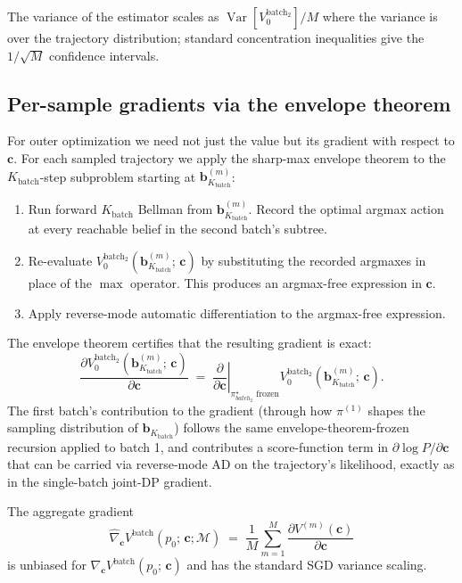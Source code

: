 \documentclass[11pt,a4paper]{article}
\newcommand{\bc}{\bm{c}}
\newcommand{\bb}{\bm{b}}
\newcommand{\Var}{\operatorname{Var}}
\begin{document}
The variance of the estimator scales as $\Var[V_0^{\mathrm{batch}_2}] / M$ where the
variance is over the trajectory distribution; standard concentration inequalities give
the $1/\sqrt{M}$ confidence intervals.

\subsection{Per-sample gradients via the envelope theorem}

For outer optimization we need not just the value but its gradient with respect to $\bc$.
For each sampled trajectory we apply the sharp-max envelope theorem to the
$K_\mathrm{batch}$-step subproblem starting at $\bb_{K_\mathrm{batch}}^{(m)}$:
\begin{enumerate}[nosep, leftmargin=2em]
\item Run forward $K_\mathrm{batch}$ Bellman from $\bb_{K_\mathrm{batch}}^{(m)}$.  Record
      the optimal argmax action at every reachable belief in the second batch's subtree.
\item Re-evaluate $V_0^{\mathrm{batch}_2}(\bb_{K_\mathrm{batch}}^{(m)};\, \bc)$ by
      substituting the recorded argmaxes in place of the $\max$ operator.  This produces
      an argmax-free expression in $\bc$.
\item Apply reverse-mode automatic differentiation to the argmax-free expression.
\end{enumerate}

The envelope theorem certifies that the resulting gradient is exact:
\begin{equation}
\frac{\partial V_0^{\mathrm{batch}_2}(\bb_{K_\mathrm{batch}}^{(m)};\, \bc)}{\partial \bc}
\;=\;
\left.\frac{\partial}{\partial \bc}\right|_{\pi^\star_{batch_2} \text{ frozen}}
V_0^{\mathrm{batch}_2}(\bb_{K_\mathrm{batch}}^{(m)};\, \bc).
\label{eq:envelope}
\end{equation}
The first batch's contribution to the gradient (through how $\pi^{(1)}$ shapes the sampling
distribution of $\bb_{K_\mathrm{batch}}$) follows the same envelope-theorem-frozen recursion
applied to batch 1, and contributes a score-function term in $\partial \log P / \partial \bc$
that can be carried via reverse-mode AD on the trajectory's likelihood, exactly as in the
single-batch joint-DP gradient.

The aggregate gradient
\begin{equation}
\widehat{\nabla}_{\bc} V^\mathrm{batch}(p_0;\, \bc; \mathcal{M})
\;=\;
\frac{1}{M} \sum_{m=1}^{M}
\frac{\partial V^{(m)}(\bc)}{\partial \bc}
\label{eq:agg_grad}
\end{equation}
is unbiased for $\nabla_{\bc} V^\mathrm{batch}(p_0;\, \bc)$ and has the standard SGD
variance scaling.
\end{document}
